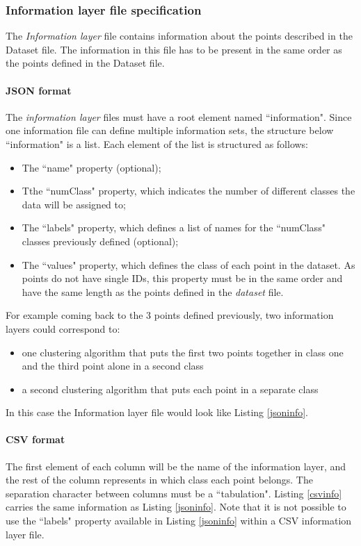 \documentclass[10pt]{bmc_article}
\newenvironment{bmcformat}{\baselineskip20pt\sloppy\setboolean{publ}{false}}{\baselineskip20pt\sloppy}
\begin{document}
\begin{bmcformat}
\subsubsection{Information layer file specification}The {\it{Information layer}} file contains information about the points described in the Dataset file. The information in this file has to be present in the same order as the points defined in the Dataset file.

\paragraph{JSON format}
The {\it{information layer}} files must have a root element named  ``information". Since one information file can define multiple information sets, the structure below ``information" is a list. Each element of the list is structured as follows:
\begin{itemize}
\item{The ``name" property (optional);}
\item{Tthe ``numClass" property, which indicates the number of different classes the data will be assigned to;}
\item{The ``labels" property, which defines a list of names for the ``numClass" classes previously defined (optional);}
\item{The ``values" property, which defines the class of each point in the dataset. As points do not have single IDs, this property must be in the same order and have the same length as the points defined in the {\it{dataset}} file.}
\end{itemize}

For example coming back to the 3 points defined previously, two information layers could correspond to: 
\begin{itemize}

\item{one clustering algorithm that puts the first two points together in class one and the third point alone in a second class}
\item{a second clustering algorithm that puts each point in a separate class}
\end{itemize}

In this case the Information layer file would look like Listing \ref{jsoninfo}.


\paragraph{CSV format}
The first element of each column will be the name of the information layer, and the rest of the column represents in which class each point belongs. The separation character between columns must be a ``tabulation". Listing \ref{csvinfo} carries the same information as Listing \ref{jsoninfo}. Note that it is not possible to use the ``labels" property available in Listing \ref{jsoninfo} within a CSV information layer file. 




\end{bmcformat}
\end{document}
